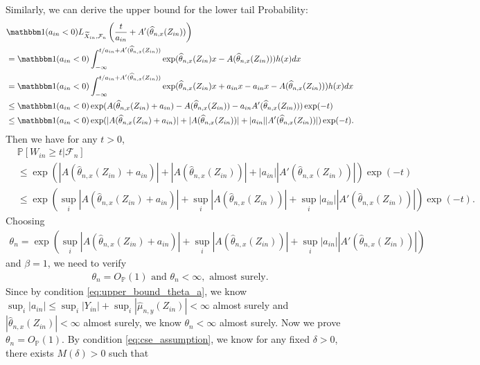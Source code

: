 \documentclass[12pt]{article}
\theoremstyle{definition}
\def\P{\mathbb{P}}
\def\P{\mathbb{P}}
\renewcommand{\P}{\mathbb{P}}							%
\newcommand{\indicator}{\mathbbm 1}						%
\newcommand{\srz}{Z}									%
\newcommand{\srxk}{\widetilde X}						%
\newcommand{\sry}{Y}									%
\begin{document}
Similarly, we can derive the upper bound for the lower tail Probability: 
\begin{align*}
  &
  \indicator(a_{in}<0)L_{\srxk_{in},\mathcal{F}_n}\left(\frac{t}{a_{in}}+A'(\widehat{\theta}_{n,x}(\srz_{in}))\right)\\
  &
  =\indicator(a_{in}<0)\int_{-\infty}^{t/a_{in}+A'(\widehat{\theta}_{n,x}(\srz_{in}))}\exp(\widehat{\theta}_{n,x}(\srz_{in})x-A(\widehat{\theta}_{n,x}(\srz_{in})))h(x)dx\\
  &
  =\indicator(a_{in}<0)\int_{-\infty}^{t/a_{in}+A'(\widehat{\theta}_{n,x}(\srz_{in}))}\exp(\widehat{\theta}_{n,x}(\srz_{in})x+a_{in}x - a_{in}x-A(\widehat{\theta}_{n,x}(\srz_{in})))h(x)dx\\
  &
  \leq \indicator(a_{in}<0)\exp(A(\widehat{\theta}_{n,x}(\srz_{in})+a_{in})-A(\widehat{\theta}_{n,x}(\srz_{in}))-a_{in}A'(\widehat{\theta}_{n,x}(\srz_{in})))\exp(-t)\\
  &
  \leq \indicator(a_{in}<0)\exp(|A(\widehat{\theta}_{n,x}(\srz_{in})+a_{in})|+|A(\widehat{\theta}_{n,x}(\srz_{in}))|+|a_{in}||A'(\widehat{\theta}_{n,x}(\srz_{in}))|)\exp(-t).
\end{align*}
Then we have for any $t>0$,
\begin{align*}
  &
  \P[W_{in}\geq t|\mathcal{F}_n]\\
  &
  \leq \exp(|A(\widehat{\theta}_{n,x}(\srz_{in})+a_{in})|+|A(\widehat{\theta}_{n,x}(\srz_{in}))|+|a_{in}||A'(\widehat{\theta}_{n,x}(\srz_{in}))|)\exp(-t)\\
  &
  \leq \exp(\sup_{i}|A(\widehat{\theta}_{n,x}(\srz_{in})+a_{in})|+\sup_{i}|A(\widehat{\theta}_{n,x}(\srz_{in}))|+\sup_i|a_{in}||A'(\widehat{\theta}_{n,x}(\srz_{in}))|)\exp(-t).
\end{align*}
Choosing
\begin{align*}
  \theta_n=\exp\left(\sup_{i}|A(\widehat{\theta}_{n,x}(\srz_{in})+a_{in})|+\sup_{i}|A(\widehat{\theta}_{n,x}(\srz_{in}))|+\sup_i|a_{in}||A'(\widehat{\theta}_{n,x}(\srz_{in}))|\right)
\end{align*}
and $\beta = 1$, we need to verify 
\begin{align*}
  \theta_n=O_{\P}(1)\text{ and }\theta_n<\infty,\text{ almost surely}.
\end{align*}
Since by condition \eqref{eq:upper_bound_theta_a}, we know $\sup_i|a_{in}|\leq \sup_i |\sry_{in}|+\sup_{i}|\widehat{\mu}_{n,y}(\srz_{in})|<\infty $ almost surely and $|\widehat{\theta}_{n,x}(\srz_{in})|<\infty$ almost surely, we know $\theta_n<\infty$ almost surely. Now we prove $\theta_n=O_{\P}(1)$. By condition \eqref{eq:cse_assumption}, we know for any fixed $\delta>0$, there exists $M(\delta)>0$ such that 
\end{document}
